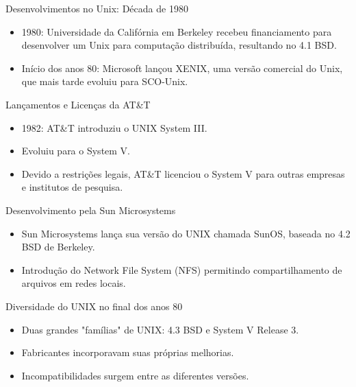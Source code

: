 \documentclass{beamer}
\begin{document}
\begin{frame}{Desenvolvimentos no Unix: Década de 1980}
    \begin{itemize}
        \item 1980: Universidade da Califórnia em Berkeley recebeu financiamento para desenvolver um Unix para computação distribuída, resultando no 4.1 BSD.
        \item Início dos anos 80: Microsoft lançou XENIX, uma versão comercial do Unix, que mais tarde evoluiu para SCO-Unix.
    \end{itemize}
\end{frame}

\begin{frame}{Lançamentos e Licenças da AT\&T}
    \begin{itemize}
        \item 1982: AT\&T introduziu o UNIX System III.
        \item Evoluiu para o System V.
        \item Devido a restrições legais, AT\&T licenciou o System V para outras empresas e institutos de pesquisa.
    \end{itemize}
\end{frame}
\begin{frame}{Desenvolvimento pela Sun Microsystems}
    \begin{itemize}
        \item Sun Microsystems lança sua versão do UNIX chamada SunOS, baseada no 4.2 BSD de Berkeley.
        \item Introdução do Network File System (NFS) permitindo compartilhamento de arquivos em redes locais.
    \end{itemize}
\end{frame}

\begin{frame}{Diversidade do UNIX no final dos anos 80}
    \begin{itemize}
        \item Duas grandes "famílias" de UNIX: 4.3 BSD e System V Release 3.
        \item Fabricantes incorporavam suas próprias melhorias.
        \item Incompatibilidades surgem entre as diferentes versões.
    \end{itemize}
\end{frame}
\end{document}
